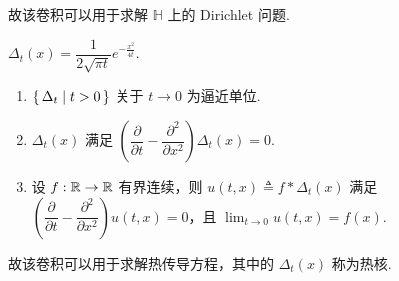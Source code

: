 故该卷积可以用于求解 $\mathbb{H}$ 上的 Dirichlet 问题.

\begin{example}
    $\Delta_t(x)=\dfrac{1}{2\sqrt{\pi t}}e^{-\frac{x^2}{4t}}$.
\end{example}

\begin{property}
    \begin{enumerate}
        \item $\set{\Delta_t|t>0}$ 关于 $t\to 0$ 为逼近单位.
        
        \item $\Delta_t(x)$ 满足 $\left(\dfrac{\partial}{\partial t}-\dfrac{\partial^2}{\partial x^2}\right)\Delta_t(x)=0$.
        
        \item 设 $f:\mathbb{R}\to\mathbb{R}$ 有界连续，则 $u(t,x)\triangleq f*\Delta_t(x)$ 满足 $\left(\dfrac{\partial}{\partial t}-\dfrac{\partial^2}{\partial x^2}\right)u(t,x)=0$，且 $\displaystyle\lim_{t\to 0}u(t,x)=f(x)$.
    \end{enumerate}
\end{property}

故该卷积可以用于求解热传导方程，其中的 $\Delta_t(x)$ 称为热核.